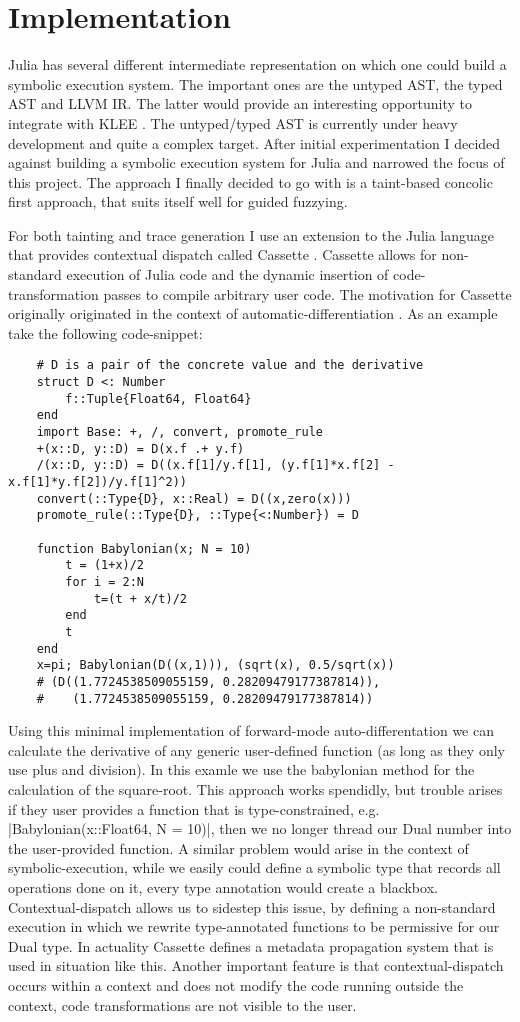 \documentclass{article} %
\begin{document}
\section{Implementation}
Julia has several different intermediate representation on which one could build a symbolic execution system.
The important ones are the untyped AST, the typed AST and LLVM IR. The latter would provide an interesting
opportunity to integrate with KLEE \cite{Cadar_Dunbar_Engler}. The untyped/typed AST is currently under heavy
development and quite a complex target. After initial experimentation I decided against building a symbolic
execution system for Julia and narrowed the focus of this project. The approach I finally decided to go with
is a taint-based concolic first approach, that suits itself well for guided fuzzying.

For both tainting and trace generation I use an extension to the Julia language that provides contextual dispatch
called Cassette \cite{Revels_undated-st}. Cassette allows for non-standard execution of Julia code and the dynamic
insertion of code-transformation passes to compile arbitrary user code. The motivation for Cassette originally
originated in the context of automatic-differentiation \cite{noauthor_undated-iv}. As an example take the
following code-snippet:

\begin{verbatim}
    # D is a pair of the concrete value and the derivative
    struct D <: Number
        f::Tuple{Float64, Float64}
    end
    import Base: +, /, convert, promote_rule
    +(x::D, y::D) = D(x.f .+ y.f)
    /(x::D, y::D) = D((x.f[1]/y.f[1], (y.f[1]*x.f[2] - x.f[1]*y.f[2])/y.f[1]^2))
    convert(::Type{D}, x::Real) = D((x,zero(x)))
    promote_rule(::Type{D}, ::Type{<:Number}) = D

    function Babylonian(x; N = 10)
        t = (1+x)/2
        for i = 2:N
            t=(t + x/t)/2
        end
        t
    end
    x=pi; Babylonian(D((x,1))), (sqrt(x), 0.5/sqrt(x))
    # (D((1.7724538509055159, 0.28209479177387814)),
    #    (1.7724538509055159, 0.28209479177387814))
\end{verbatim}
Using this minimal implementation of forward-mode auto-differentation we can calculate the derivative of
any generic user-defined function (as long as they only use plus and division). In this examle we use the 
babylonian method for the calculation of the square-root. This approach works spendidly, but trouble arises if they user provides a function
that is type-constrained, e.g. |Babylonian(x::Float64, N = 10)|, then we no longer thread our Dual
number into the user-provided function. A similar problem would arise in the context of symbolic-execution,
while we easily could define a symbolic type that records all operations done on it, every type annotation
would create a blackbox. Contextual-dispatch allows us to sidestep this issue, by defining a non-standard
execution in which we rewrite type-annotated functions to be permissive for our Dual type. In actuality
Cassette defines a metadata propagation system that is used in situation like this.
Another important feature is that contextual-dispatch occurs within a context and does not modify the code
running outside the context, code transformations are not visible to the user.
\end{document}
